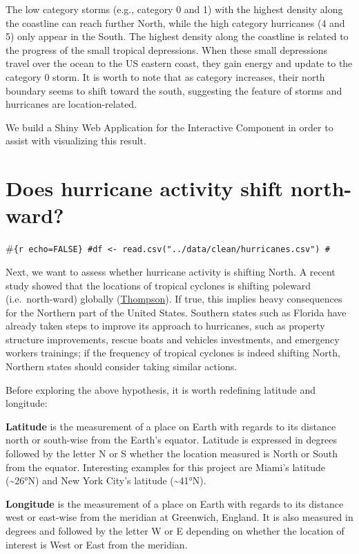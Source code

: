 \documentclass[]{book}
\begin{document}
The low category storms (e.g., category 0 and 1) with the highest density along the coastline can reach further North, while the high category hurricanes (4 and 5) only appear in the South. The highest density along the coastline is related to the progress of the small tropical depressions. When these small depressions travel over the ocean to the US eastern coast, they gain energy and update to the category 0 storm. It is worth to note that as category increases, their north boundary seems to shift toward the south, suggesting the feature of storms and hurricanes are location-related.

We build a Shiny Web Application for the Interactive Component in order to assist with visualizing this result.

\hypertarget{does-hurricane-activity-shift-north-ward}{%
\section{Does hurricane activity shift north-ward?}\label{does-hurricane-activity-shift-north-ward}}

\#\texttt{\{r\ echo=FALSE\}\ \#df\ \textless{}-\ read.csv("../data/clean/hurricanes.csv")\ \#}

Next, we want to assess whether hurricane activity is shifting North. A recent study showed that the locations of tropical cyclones is shifting poleward (i.e.~north-ward) globally (\href{https://www.climatecentral.org/news/warming-may-shift-hurricane-impacts-17437}{Thompson}). If true, this implies heavy consequences for the Northern part of the United States. Southern states such as Florida have already taken steps to improve its approach to hurricanes, such as property structure improvements, rescue boats and vehicles investments, and emergency workers trainings; if the frequency of tropical cyclones is indeed shifting North, Northern states should consider taking similar actions.

Before exploring the above hypothesis, it is worth redefining latitude and longitude:

\textbf{Latitude} is the measurement of a place on Earth with regards to its distance north or south-wise from the Earth's equator. Latitude is expressed in degrees followed by the letter N or S whether the location measured is North or South from the equator. Interesting examples for this project are Miami's latitude (\textasciitilde{}26°N) and New York City's latitude (\textasciitilde{}41°N).

\textbf{Longitude} is the measurement of a place on Earth with regards to its distance west or east-wise from the meridian at Greenwich, England. It is also measured in degrees and followed by the letter W or E depending on whether the location of interest is West or East from the meridian.
\end{document}
